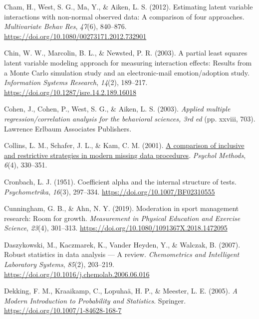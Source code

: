 \documentclass[
  man]{apa6}
\newlength{\cslhangindent}
\newenvironment{CSLReferences}[2] %
 {\begin{list}{}{%
  \setlength{\itemindent}{0pt}
  \setlength{\leftmargin}{0pt}
  \setlength{\parsep}{0pt}
  \ifodd #1
   \setlength{\leftmargin}{\cslhangindent}
   \setlength{\itemindent}{-1\cslhangindent}
  \fi
  \setlength{\itemsep}{#2\baselineskip}}}
 {\end{list}}
\begin{document}
\begin{CSLReferences}{1}{0}
Cham, H., West, S. G., Ma, Y., \& Aiken, L. S. (2012). Estimating latent variable interactions with non-normal observed data: {A} comparison of four approaches. \emph{Multivariate Behav Res}, \emph{47}(6), 840--876. \url{https://doi.org/10.1080/00273171.2012.732901}

Chin, W. W., Marcolin, B. L., \& Newsted, P. R. (2003). A partial least squares latent variable modeling approach for measuring interaction effects: {Results} from a {Monte Carlo} simulation study and an electronic-mail emotion/adoption study. \emph{Information Systems Research}, \emph{14}(2), 189--217. \url{https://doi.org/10.1287/isre.14.2.189.16018}

Cohen, J., Cohen, P., West, S. G., \& Aiken, L. S. (2003). \emph{Applied multiple regression/correlation analysis for the behavioral sciences, 3rd ed} (pp. xxviii, 703). Lawrence Erlbaum Associates Publishers.

Collins, L. M., Schafer, J. L., \& Kam, C. M. (2001). \href{https://www.ncbi.nlm.nih.gov/pubmed/11778676}{A comparison of inclusive and restrictive strategies in modern missing data procedures}. \emph{Psychol Methods}, \emph{6}(4), 330--351.

Cronbach, L. J. (1951). Coefficient alpha and the internal structure of tests. \emph{Psychometrika}, \emph{16}(3), 297--334. \url{https://doi.org/10.1007/BF02310555}

Cunningham, G. B., \& Ahn, N. Y. (2019). Moderation in sport management research: {Room} for growth. \emph{Measurement in Physical Education and Exercise Science}, \emph{23}(4), 301--313. \url{https://doi.org/10.1080/1091367X.2018.1472095}

Daszykowski, M., Kaczmarek, K., Vander Heyden, Y., \& Walczak, B. (2007). Robust statistics in data analysis --- {A} review. \emph{Chemometrics and Intelligent Laboratory Systems}, \emph{85}(2), 203--219. \url{https://doi.org/10.1016/j.chemolab.2006.06.016}

Dekking, F. M., Kraaikamp, C., Lopuhaä, H. P., \& Meester, L. E. (2005). \emph{A {Modern Introduction} to {Probability} and {Statistics}}. Springer. \url{https://doi.org/10.1007/1-84628-168-7}


\end{CSLReferences}
\end{document}

